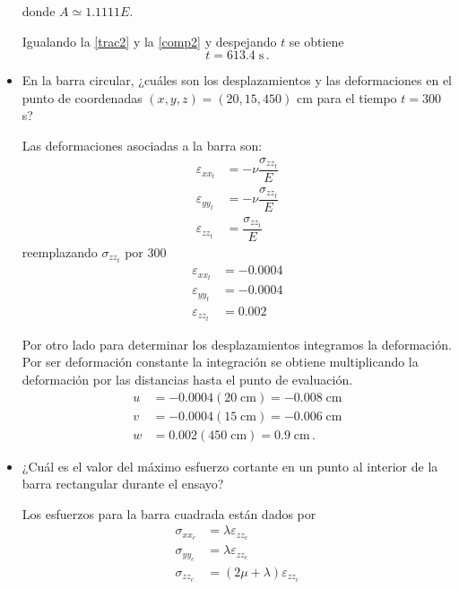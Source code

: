 \documentclass[../notas medios.tex]{subfiles}
\begin{document}
\begin{itemize}
donde $A \simeq 1.1111E$.

Igualando la \cref {trac2} y la  \cref{comp2} y despejando $t$ se obtiene
\[t=613.4 \; \text{s}\, .\]
	
\item En la barra circular, ¿cuáles son los desplazamientos y las deformaciones en el punto de coordenadas $(x,y,z) = (20,15,450)$ cm para el tiempo $t = 300$ s?

Las deformaciones asociadas a la barra son: 
\begin{equation}
  \begin{split}	
  \varepsilon_{xx_t} &= -\nu \dfrac{\sigma_{zz_t} }{E} \\
  \varepsilon_{yy_t} &= -\nu \dfrac{\sigma_{zz_t} }{E} \\
  \varepsilon_{zz_t} &= \dfrac{\sigma_{zz_t} }{E} 
  \end{split}
  \label{defpto2}
\end{equation}
reemplazando $\sigma_{zz_t}$ por 300
\begin{equation}
  \begin{split}
  \varepsilon_{xx_t} &= -0.0004 \\
  \varepsilon_{yy_t} &= -0.0004 \\
  \varepsilon_{zz_t} &= 0.002
  \end{split}
  \label{defpto2sol}
\end{equation}

Por otro lado para determinar los desplazamientos integramos la deformación. Por ser deformación constante la integración se obtiene multiplicando la deformación por las distancias hasta el punto de evaluación. 
\begin{equation}
  \begin{split}
  u &= -0.0004 (20  \;\text{cm}) = -0.008 \;\text{cm} \\
  v &= -0.0004 (15  \;\text{cm}) = -0.006 \;\text{cm}  \\
  w &= 0.002  (450  \;\text{cm}) = 0.9  \; \text{cm}\, .
  \end{split}
\label{defpto2sol}
\end{equation}

\item  ¿Cuál es el valor del máximo esfuerzo cortante en un punto al interior de la barra rectangular durante el ensayo?

Los esfuerzos para la barra cuadrada están dados por
\begin{equation}
  \begin{split}	
  \sigma_{xx_c} &=   \lambda \varepsilon_{zz_c} \\
  \sigma_{yy_c} &=   \lambda \varepsilon_{zz_c} \\
  \sigma_{zz_c} &=  (2\mu + \lambda) \varepsilon_{zz_c}
  \end{split}
  \label{defpto2}
\end{equation}


\end{itemize}
\end{document}
